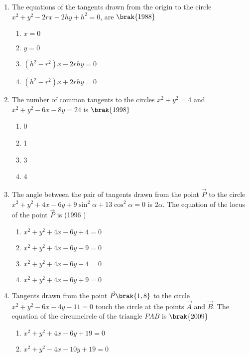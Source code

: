 \begin{enumerate}
\item The equations of the tangents drawn from the origin to the circle $x^2+y^2-2rx-2hy+h^2=0$, are
    \hfill$\brak{1988}$
\begin{multicols}{2}
\begin{enumerate}
    \item $x=0$
    \item $y=0$
    \item $(h^2-r^2)x-2rhy=0$
    \item $(h^2-r^2)x+2rhy=0$
\end{enumerate}
\end{multicols}
\item The number of common tangents to the circles $x^2+y^2=4$ and $x^2+y^2-6x-8y=24$ is 
    \hfill$\brak{1998}$
\begin{multicols}{4}
\begin{enumerate}
    \item 0
    \item 1 
    \item 3
    \item 4
\end{enumerate}
\end{multicols}
    \item The angle between the pair of tangents drawn from the point $\vec{P}$ to the circle $x^{2}+y^{2}+4x-6y+9\sin^{2}{\alpha}+13\cos^{2}{\alpha}=0$ is $2\alpha$. The equation of the locus of the point $\vec{P}$ is
    \hfill {(1996 )}
    \begin{multicols}{2}
\begin{enumerate}
    	\item $x^{2}+y^{2}+4x-6y+4=0$
    	\item $x^{2}+y^{2}+4x-6y-9=0$
    	\item $x^{2}+y^{2}+4x-6y-4=0$
    	\item $x^{2}+y^{2}+4x-6y+9=0$
    \end{enumerate}
\end{multicols}
         \item Tangents drawn from the point $\vec{P}\brak{1, 8}$ to the circle $x^2+y^2-6x-4y-11=0$ touch the circle at the points $\vec{A}$ and $\vec{B}$. The equation of the circumcircle of the triangle $PAB$ is
             \hfill$\brak{2009}$
             \begin{multicols}{2}
\begin{enumerate}
             \item $x^2+y^2+4x-6y+19=0$
             \item $x^2+y^2-4x-10y+19=0$

\end{enumerate}
\end{multicols}
\end{enumerate}

